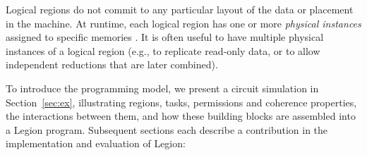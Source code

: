 \documentclass[conference]{IEEEtran}
\begin{document}
Logical regions do not commit to any particular layout of the data or
placement in the machine.  At runtime, each logical region has one or
more {\em physical instances} assigned to specific memories .  It is often useful to have multiple
physical instances of a logical region (e.g., to replicate read-only data, or to allow
independent reductions that are later combined).

To introduce the programming model, we present
a circuit simulation in
Section~\ref{sec:ex}, illustrating regions, tasks,
permissions and coherence properties, the interactions between them,
and how these building blocks are assembled into a Legion
program.  Subsequent sections each describe a contribution in the
implementation and evaluation of Legion:


 
\end{document}
